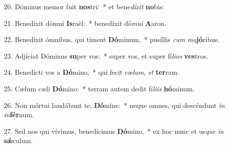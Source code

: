 20. Dóminus memor fuit \textbf{nos}tri:~*  et bene\textit{dí}\textit{xit} \textbf{no}bis:\

21. Benedíxit dómui \textbf{Is}raël:~*  benedíxit dó\textit{mu}\textit{i} \textbf{A}aron.\

22. Benedíxit ómnibus, qui timent \textbf{Dó}minum,~*  pusíllis \textit{cum} \textit{ma}\textbf{jó}ribus.\

23. Adjíciat Dóminus \textbf{su}per vos:~*  super vos, et super fí\textit{li}\textit{os} \textbf{ves}tros.\

24. Benedícti vos a \textbf{Dó}mino,~*  qui fecit cæ\textit{lum}, \textit{et} \textbf{ter}ram.\

25. Cælum cæli \textbf{Dó}mino:~*  terram autem dedit fí\textit{li}\textit{is} \textbf{hó}minum.\

26. Non mórtui laudábunt te, \textbf{Dó}mine:~*  neque omnes, qui descéndunt \textit{in} \textit{in}\textbf{fér}num.\

27. Sed nos qui vívimus, benedícimus \textbf{Dó}mino,~*  ex hoc nunc et us\textit{que} \textit{in} \textbf{sǽ}culum.\

